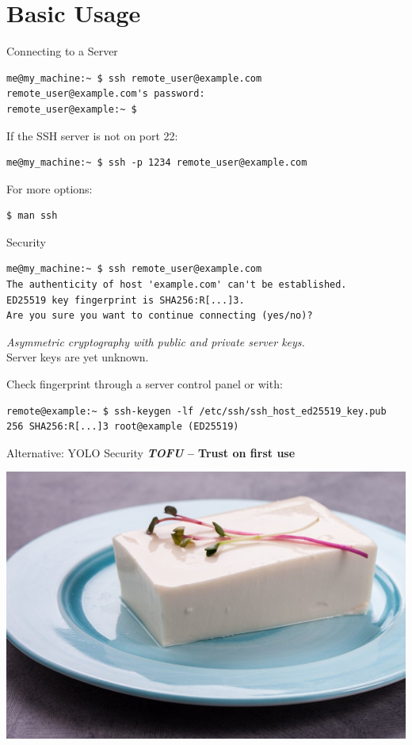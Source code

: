 \documentclass[10pt, graphics, aspectratio=169, table]{beamer}
\begin{document}
\section{Basic Usage}
\begin{frame}[fragile]{Connecting to a Server}
	\begin{lstlisting}
me@my_machine:~ $ ssh remote_user@example.com
remote_user@example.com's password:
remote_user@example:~ $
	\end{lstlisting}
	\pause

	If the SSH server is not on port 22:
	\begin{lstlisting}
me@my_machine:~ $ ssh -p 1234 remote_user@example.com
	\end{lstlisting}
	\pause

	For more options:
	\begin{lstlisting}
$ man ssh
	\end{lstlisting}
\end{frame}

\begin{frame}[fragile]{Security}
	\begin{lstlisting}
me@my_machine:~ $ ssh remote_user@example.com
The authenticity of host 'example.com' can't be established.
ED25519 key fingerprint is SHA256:R[...]3.
Are you sure you want to continue connecting (yes/no)?
	\end{lstlisting}
	\pause

	\emph{Asymmetric cryptography with public and private server keys.} \\
	Server keys are yet unknown.
	\pause

	Check fingerprint through a server control panel or with:
	\begin{lstlisting}
remote@example:~ $ ssh-keygen -lf /etc/ssh/ssh_host_ed25519_key.pub
256 SHA256:R[...]3 root@example (ED25519)
	\end{lstlisting}
\end{frame}

\begin{frame}{Alternative: YOLO Security}
	\centering
	\textbf{\emph{TOFU} -- Trust on first use}

	\includegraphics[height=0.65\paperheight]{img/tofu.jpg} \cite{tofu}
\end{frame}
\end{document}
